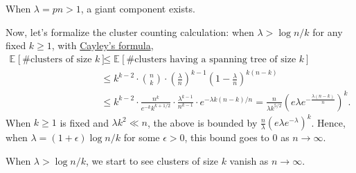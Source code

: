 \begin{prev}
	When \(\lambda = pn > 1\), a giant component exists.
\end{prev}

Now, let's formalize the cluster counting calculation: when \(\lambda > \log n / k\) for any fixed \(k \geq 1\), with \hyperref[thm:Cayley-formula]{Cayley's formula},
\begin{equation}\label{eq:Erdős-Rényi-cluster-size}
	\begin{split}
		\mathbb{E}_{}[\text{\#clusters of size \(k\)}]
		 & \leq \mathbb{E}_{}[\text{\#clusters having a spanning tree of size \(k\)} ]                                                   \\
		 & \leq k^{k-2} \cdot \binom{n}{k} \cdot \left( \frac{\lambda }{n} \right) ^{k-1} \left( 1 - \frac{\lambda}{n} \right) ^{k(n-k)} \\
		 & \leq k^{k-2} \cdot \frac{n^k}{e^{-k} k^{k + 1 / 2}} \cdot \frac{\lambda ^{k-1}}{n^{k-1}} \cdot e^{- \lambda k(n-k) / n}
		= \frac{n}{\lambda k^{5 / 2}} \left( e \lambda e^{- \frac{\lambda (n-k)}{n}} \right) ^k.
	\end{split}
\end{equation}
When \(k \geq 1\) is fixed and \(\lambda k^2 \ll n\), the above is bounded by \(\frac{n}{\lambda } (e \lambda e^{-\lambda })^k\). Hence, when \(\lambda = (1 + \epsilon ) \log n / k\) for some \(\epsilon > 0\), this bound goes to \(0\) as \(n \to \infty \).

\begin{remark}
	When \(\lambda > \log n / k\), we start to see clusters of size \(k\) vanish as \(n \to \infty \).
\end{remark}

